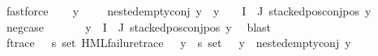 \begin{isabellebody}
\ fastforce\isanewline
\ \ \isamarkupfalse%
\ {\isachardoublequoteopen}{\isacharparenleft}{\kern0pt}{\isasymforall}y\ {\isasymin}\ {\isacharparenleft}{\kern0pt}{\isasymPsi}\ {\isacharbackquote}{\kern0pt}\ {\isacharbraceleft}{\kern0pt}{\isacharbraceright}{\kern0pt}{\isacharparenright}{\kern0pt}{\isachardot}{\kern0pt}\ nested{\isacharunderscore}{\kern0pt}empty{\isacharunderscore}{\kern0pt}conj\ y{\isacharparenright}{\kern0pt}\ {\isasymand}\ {\isacharparenleft}{\kern0pt}{\isasymforall}y\ {\isasymin}\ {\isacharparenleft}{\kern0pt}{\isasymPsi}\ {\isacharbackquote}{\kern0pt}\ {\isacharparenleft}{\kern0pt}I\ {\isasyminter}\ J{\isacharparenright}{\kern0pt}{\isacharparenright}{\kern0pt}{\isachardot}{\kern0pt}\ stacked{\isacharunderscore}{\kern0pt}pos{\isacharunderscore}{\kern0pt}conj{\isacharunderscore}{\kern0pt}pos\ y{\isacharparenright}{\kern0pt}{\isachardoublequoteclose}\ \isanewline
\ \ \ \ \isamarkupfalse%
\ neg{\isacharunderscore}{\kern0pt}case\ \isanewline
\ \ \ \ \isamarkupfalse%
\ {\isacartoucheopen}{\isasymforall}y{\isasymin}{\isasymPsi}\ {\isacharbackquote}{\kern0pt}\ {\isacharparenleft}{\kern0pt}I\ {\isasyminter}\ J{\isacharparenright}{\kern0pt}{\isachardot}{\kern0pt}\ stacked{\isacharunderscore}{\kern0pt}pos{\isacharunderscore}{\kern0pt}conj{\isacharunderscore}{\kern0pt}pos\ y{\isacartoucheclose}\ \isamarkupfalse%
\ blast\isanewline
\ \ \isamarkupfalse%
\ f{\isacharunderscore}{\kern0pt}trace{\isacharcolon}{\kern0pt}\ {\isachardoublequoteopen}{\isacharparenleft}{\kern0pt}{\isacharparenleft}{\kern0pt}{\isasymexists}{\isasympsi}{\isasymin}{\isacharparenleft}{\kern0pt}{\isasymPsi}\ {\isacharbackquote}{\kern0pt}\ {\isacharparenleft}{\kern0pt}{\isacharbraceleft}{\kern0pt}{\isacharbraceright}{\kern0pt}{\isacharcolon}{\kern0pt}{\isacharcolon}{\kern0pt}{\isacharprime}{\kern0pt}s\ set{\isacharparenright}{\kern0pt}{\isacharparenright}{\kern0pt}{\isachardot}{\kern0pt}\ HML{\isacharunderscore}{\kern0pt}failure{\isacharunderscore}{\kern0pt}trace\ {\isasympsi}\ {\isasymand}\ {\isacharparenleft}{\kern0pt}{\isasymforall}y{\isasymin}{\isacharparenleft}{\kern0pt}{\isasymPsi}\ {\isacharbackquote}{\kern0pt}\ {\isacharparenleft}{\kern0pt}{\isacharbraceleft}{\kern0pt}{\isacharbraceright}{\kern0pt}{\isacharcolon}{\kern0pt}{\isacharcolon}{\kern0pt}{\isacharprime}{\kern0pt}s\ set{\isacharparenright}{\kern0pt}{\isacharparenright}{\kern0pt}{\isachardot}{\kern0pt}\ {\isasympsi}\ {\isasymnoteq}\ y\ {\isasymlongrightarrow}\ nested{\isacharunderscore}{\kern0pt}empty{\isacharunderscore}{\kern0pt}conj\ y{\isacharparenright}{\kern0pt}{\isacharparenright}{\kern0pt}\ {\isasymor}\isanewline

\end{isabellebody}
